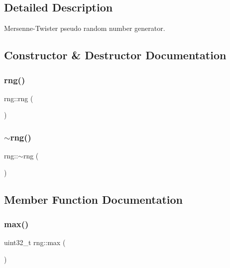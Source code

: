 \subsection{Detailed Description}
Mersenne-\/\+Twister pseudo random number generator. 

\subsection{Constructor \& Destructor Documentation}
\hypertarget{classrng_a42a6b92cac3b2a289f8d21fe8cfe6101}{}\label{classrng_a42a6b92cac3b2a289f8d21fe8cfe6101} 
\subsubsection{\texorpdfstring{rng()}{rng()}}
{\footnotesize\ttfamily rng\+::rng (\begin{DoxyParamCaption}{ }\end{DoxyParamCaption})\hspace{0.3cm}{\ttfamily [inline]}}

\hypertarget{classrng_a6fca2df7036b5f2f76b9b642523f5d19}{}\label{classrng_a6fca2df7036b5f2f76b9b642523f5d19} 
\subsubsection{\texorpdfstring{$\sim$rng()}{~rng()}}
{\footnotesize\ttfamily rng\+::$\sim$rng (\begin{DoxyParamCaption}{ }\end{DoxyParamCaption})\hspace{0.3cm}{\ttfamily [inline]}}



\subsection{Member Function Documentation}
\hypertarget{classrng_aea990d0e1df0fc4a5850d7a3dedee633}{}\label{classrng_aea990d0e1df0fc4a5850d7a3dedee633} 
\subsubsection{\texorpdfstring{max()}{max()}}
{\footnotesize\ttfamily uint32\+\_\+t rng\+::max (\begin{DoxyParamCaption}{ }\end{DoxyParamCaption})\hspace{0.3cm}{\ttfamily [inline]}}

